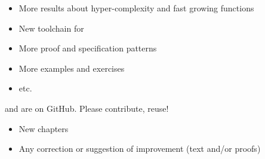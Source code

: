 \documentclass[10pt, fleqn]{beamer}
\begin{document}

\begin{frame}
  \begin{block}{}
    \begin{itemize}
      \item More results about hyper-complexity and fast growing functions
    \item New toolchain for \alectr
    \item More proof and specification patterns
    \item More examples and exercises
    \item etc.
    \end{itemize}
  \end{block}

  \begin{block}{}
  {\color{plugincolor}\Hydras} and  {\color{plugincolor}\community} are on GitHub. {\color{cyan}Please contribute, reuse!}
      \begin{itemize}
      \item New chapters
      \item Any correction or suggestion of improvement (text and/or proofs)
        
  
    \end{itemize}
     \end{block}
 
  
\end{frame}
\end{document}
